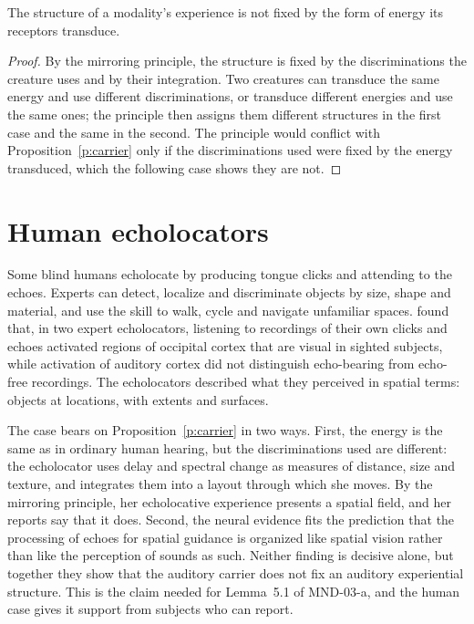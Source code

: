 \documentclass{situationist-preprint}
\begin{document}
\begin{proposition}\label{p:carrier}
The structure of a modality's experience is not fixed by the form of energy its receptors transduce.
\end{proposition}

\begin{proof}
By the mirroring principle, the structure is fixed by the discriminations the creature uses and by their integration. Two creatures can transduce the same energy and use different discriminations, or transduce different energies and use the same ones; the principle then assigns them different structures in the first case and the same in the second. The principle would conflict with Proposition~\ref{p:carrier} only if the discriminations used were fixed by the energy transduced, which the following case shows they are not.
\end{proof}

\section{Human echolocators}

Some blind humans echolocate by producing tongue clicks and attending to the echoes. Experts can detect, localize and discriminate objects by size, shape and material, and use the skill to walk, cycle and navigate unfamiliar spaces. \citet{Thaler2011} found that, in two expert echolocators, listening to recordings of their own clicks and echoes activated regions of occipital cortex that are visual in sighted subjects, while activation of auditory cortex did not distinguish echo-bearing from echo-free recordings. The echolocators described what they perceived in spatial terms: objects at locations, with extents and surfaces.

The case bears on Proposition~\ref{p:carrier} in two ways. First, the energy is the same as in ordinary human hearing, but the discriminations used are different: the echolocator uses delay and spectral change as measures of distance, size and texture, and integrates them into a layout through which she moves. By the mirroring principle, her echolocative experience presents a spatial field, and her reports say that it does. Second, the neural evidence fits the prediction that the processing of echoes for spatial guidance is organized like spatial vision rather than like the perception of sounds as such. Neither finding is decisive alone, but together they show that the auditory carrier does not fix an auditory experiential structure. This is the claim needed for Lemma~5.1 of MND-03-a, and the human case gives it support from subjects who can report.
\end{document}
